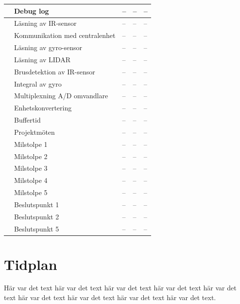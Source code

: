 \documentclass[a4paper,titlepage,12pt]{article}
\newcounter{aktNr}
\newcommand{\nextAktNr}{\stepcounter{aktNr}\arabic{aktNr}}
\begin{document}
\begin{longtable}[c]{ c p{3cm} p{6cm} p{3cm} p{2cm}}
		\nextAktNr{} & Debug log & -- & -- & -- \\ \midrule
		\nextAktNr{} & Läsning av IR-sensor & -- & -- & -- \\ \midrule
		\nextAktNr{} & Kommunikation med centralenhet & -- & -- & -- \\ \midrule
		\nextAktNr{} & Läsning av gyro-sensor & -- & -- & -- \\ \midrule
		\nextAktNr{} & Läsning av LIDAR & -- & -- & -- \\ \midrule
		\nextAktNr{} & Brusdetektion av IR-sensor & -- & -- & -- \\ \midrule
		\nextAktNr{} & Integral av gyro & -- & -- & -- \\ \midrule
		\nextAktNr{} & Multiplexning A/D omvandlare & -- & -- & -- \\ \midrule
		\nextAktNr{} & Enhetskonvertering & -- & -- & -- \\ \midrule
		\nextAktNr{} & Buffertid & -- & -- & -- \\ \midrule
		\nextAktNr{} & Projektmöten & -- & -- & -- \\ \midrule
		\nextAktNr{} & Milstolpe 1 & -- & -- & -- \\ \midrule
		\nextAktNr{} & Milstolpe 2 & -- & -- & -- \\ \midrule
		\nextAktNr{} & Milstolpe 3 & -- & -- & -- \\ \midrule
		\nextAktNr{} & Milstolpe 4 & -- & -- & -- \\ \midrule
		\nextAktNr{} & Milstolpe 5 & -- & -- & -- \\ \midrule
		\nextAktNr{} & Beslutspunkt 1 & -- & -- & -- \\ \midrule
		\nextAktNr{} & Beslutspunkt 2 & -- & -- & -- \\ \midrule
		\nextAktNr{} & Beslutspunkt 5 & -- & -- & -- \\ \midrule
	\end{longtable}

	
	\section{Tidplan}
	Här var det text här var det text här var det text
	här var det text här var det text här var det text
	här var det text här var det text här var det text.
	
	
	
\end{document}
